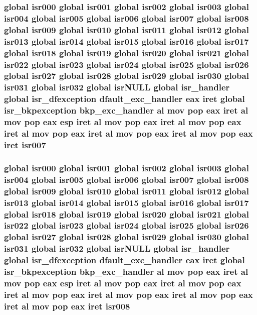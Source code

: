 \subsubsection[{\texorpdfstring{isr007}{isr007}}]{\setlength{\rightskip}{0pt plus 5cm}global {\bf isr000} global {\bf isr001} global {\bf isr002} global {\bf isr003} global {\bf isr004} global {\bf isr005} global {\bf isr006} global isr007 global {\bf isr008} global {\bf isr009} global {\bf isr010} global {\bf isr011} global {\bf isr012} global {\bf isr013} global {\bf isr014} global {\bf isr015} global {\bf isr016} global {\bf isr017} global {\bf isr018} global {\bf isr019} global {\bf isr020} global {\bf isr021} global {\bf isr022} global {\bf isr023} global {\bf isr024} global {\bf isr025} global {\bf isr026} global {\bf isr027} global {\bf isr028} global {\bf isr029} global {\bf isr030} global {\bf isr031} global isr032 global isr\+N\+U\+LL global isr\+\_\+handler global {\bf isr\+\_\+dfexception} {\bf dfault\+\_\+exc\+\_\+handler} eax iret global {\bf isr\+\_\+bkpexception} {\bf bkp\+\_\+exc\+\_\+handler} {\bf al} {\bf mov} pop eax iret {\bf al} {\bf mov} pop eax esp iret {\bf al} {\bf mov} pop eax iret {\bf al} {\bf mov} pop eax iret {\bf al} {\bf mov} pop eax iret {\bf al} {\bf mov} pop eax iret {\bf al} {\bf mov} pop eax iret isr007}\hypertarget{isrs_8as_a619d85fb596adc16c02dd38b886b80ae}{}\label{isrs_8as_a619d85fb596adc16c02dd38b886b80ae}
\subsubsection[{\texorpdfstring{isr008}{isr008}}]{\setlength{\rightskip}{0pt plus 5cm}global {\bf isr000} global {\bf isr001} global {\bf isr002} global {\bf isr003} global {\bf isr004} global {\bf isr005} global {\bf isr006} global {\bf isr007} global isr008 global {\bf isr009} global {\bf isr010} global {\bf isr011} global {\bf isr012} global {\bf isr013} global {\bf isr014} global {\bf isr015} global {\bf isr016} global {\bf isr017} global {\bf isr018} global {\bf isr019} global {\bf isr020} global {\bf isr021} global {\bf isr022} global {\bf isr023} global {\bf isr024} global {\bf isr025} global {\bf isr026} global {\bf isr027} global {\bf isr028} global {\bf isr029} global {\bf isr030} global {\bf isr031} global isr032 global isr\+N\+U\+LL global isr\+\_\+handler global {\bf isr\+\_\+dfexception} {\bf dfault\+\_\+exc\+\_\+handler} eax iret global {\bf isr\+\_\+bkpexception} {\bf bkp\+\_\+exc\+\_\+handler} {\bf al} {\bf mov} pop eax iret {\bf al} {\bf mov} pop eax esp iret {\bf al} {\bf mov} pop eax iret {\bf al} {\bf mov} pop eax iret {\bf al} {\bf mov} pop eax iret {\bf al} {\bf mov} pop eax iret {\bf al} {\bf mov} pop eax iret {\bf al} {\bf mov} pop eax iret isr008}\hypertarget{isrs_8as_aad3a654bf8efb2a14cb787c0d401d7f5}{}\label{isrs_8as_aad3a654bf8efb2a14cb787c0d401d7f5}
